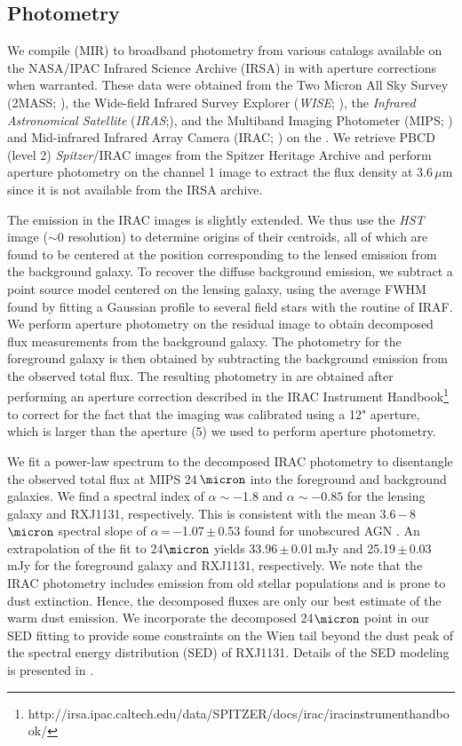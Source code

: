 \documentclass[]{emulateapj}
\begin{document}
\subsection{Photometry} \label{sec:photometry} %
We compile \mir (MIR) to \fir broadband photometry from various
catalogs available on the NASA/IPAC Infrared Science
Archive (IRSA) in  with aperture corrections
when warranted. These data were obtained from
the Two Micron All Sky Survey (2MASS; \citealt{Skrutskie06a}),
the Wide-field Infrared Survey Explorer ({\it WISE}; \citealt{Wright10a}),
the {\it Infrared Astronomical Satellite}
({\it IRAS};\citealt{Neugebauer84a}), and
the Multiband Imaging Photometer (MIPS; \citealt{Rieke04a}) and
Mid-infrared Infrared Array Camera (IRAC; \citealt{Fazio04a}) on
the \spitzer.
We retrieve PBCD (level 2) {\it Spitzer}/IRAC images from the
Spitzer Heritage Archive and perform aperture photometry on
the channel 1 image to extract the flux density at 3.6\,$\mu$m
since it is not available from the IRSA archive.

The emission in the IRAC images is slightly extended. We thus use the
{\it HST} image ($\sim$0 resolution) to determine
origins of their centroids, all of which are found to be
centered at the position corresponding to the lensed emission from the
background galaxy. To recover the diffuse background emission, we subtract a
point source model centered on the lensing galaxy, using the average
FWHM found by fitting a Gaussian profile to several field stars
with the  routine of IRAF.
We perform aperture photometry on the residual image
to obtain decomposed flux measurements from the background galaxy.
The photometry for the foreground galaxy is then obtained
by subtracting the background emission from the
observed total flux. The resulting photometry in
 are obtained after performing an aperture correction
described in the IRAC Instrument Handbook\footnote{http://irsa.ipac.caltech.edu/data/SPITZER/docs/irac/iracinstrumenthandbook/} to
correct for the fact that the imaging was calibrated
using a 12" aperture, which is larger than the aperture (5) we used to
perform aperture photometry.

We fit a power-law spectrum to the
decomposed IRAC photometry to disentangle the observed total flux
at MIPS 24\,$\micron$ into the foreground and
background galaxies. We find a spectral index of $\alpha\sim-$1.8 and
$\alpha\sim-0.85$ for the lensing galaxy and RXJ1131, respectively.
This is consistent with the mean 3.6\,$-$\,8\,$\micron$
spectral slope of
$\alpha$\,=\,$-$1.07\,$\pm$\,0.53 found for unobscured AGN
\citep{Stern05a}. An extrapolation of the fit to 24$\micron$
yields 33.96\,$\pm$\,0.01\,mJy and 25.19\,$\pm$\,0.03\,mJy
for the foreground galaxy and RXJ1131, respectively.
We note that the IRAC photometry includes
emission from old stellar populations and is prone to
dust extinction. Hence, the decomposed fluxes are only
our best estimate of the warm dust emission.
We incorporate the decomposed 24$\micron$ point in our
SED fitting to provide some constraints on
the Wien tail beyond the dust peak
of the spectral energy distribution (SED) of RXJ1131.
Details of the SED modeling is presented in .
\end{document}

